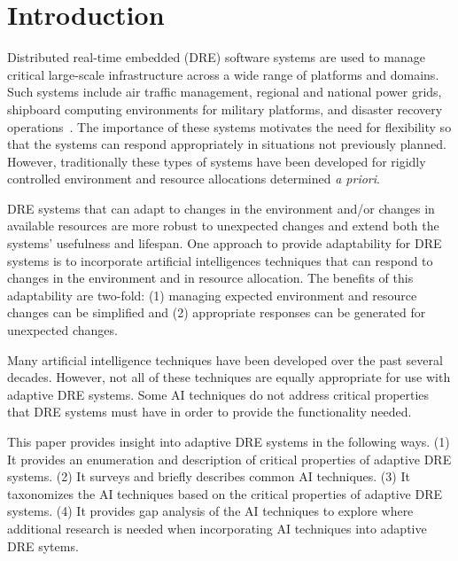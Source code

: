 \documentclass[conference]{IEEEtran}
\begin{document}
\section{Introduction}
\label{intro}
Distributed real-time embedded (DRE) software systems are used to manage critical large\--scale infrastructure across a wide range of platforms and domains. Such systems include air traffic management, regional and national power grids, shipboard computing environments for military platforms, and disaster recovery operations~\cite{Hoffert:11}. The importance of these systems motivates the need for flexibility so that the systems can respond appropriately in situations not previously planned. However, traditionally these types of systems have been developed for rigidly controlled environment and resource allocations determined \emph{a priori}.

DRE systems that can adapt to changes in the environment and/or changes in available resources are more robust to unexpected changes and extend both the systems' usefulness and lifespan. One approach to provide adaptability for DRE systems is to incorporate artificial intelligences techniques that can respond to changes in the environment and in resource allocation. The benefits of this adaptability are two-fold: (1) managing expected environment and resource changes can be simplified and (2) appropriate responses can be generated for unexpected changes. 

Many artificial intelligence techniques have been developed over the past several decades. However, not all of these techniques are equally appropriate for use with adaptive DRE systems. Some AI techniques do not address critical properties that DRE systems must have in order to provide the functionality needed.

This paper provides insight into adaptive DRE systems in the following ways. (1) It provides an enumeration and description of critical properties of adaptive DRE systems. (2) It surveys and briefly describes common AI techniques. (3) It taxonomizes the AI techniques based on the critical properties of adaptive DRE systems. (4) It provides gap analysis of the AI techniques to explore where additional research is needed when incorporating AI techniques into adaptive DRE sytems.
\end{document}
